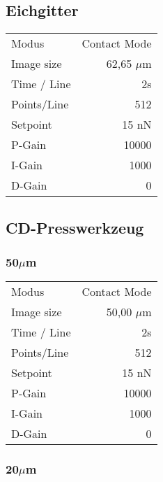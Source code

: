 \subsection*{Eichgitter}
\begin{center}
    \centering
    \begin{tabular}{l|r}
        Modus & Contact Mode \\
        Image size & 62,65 $\mu$m \\
        Time / Line & 2s \\
        Points/Line & 512\\
        Setpoint & 15 nN \\
        P-Gain & 10000 \\
        I-Gain & 1000 \\
        D-Gain & 0 \\
        
    \end{tabular}
\end{center}

\subsection*{CD-Presswerkzeug}
\subsubsection*{50$\mu$m}
\begin{center}
    \centering
    \begin{tabular}{l|r}
        Modus & Contact Mode\\
        Image size & 50,00 $\mu$m \\
        Time / Line & 2s \\
        Points/Line & 512\\
        Setpoint & 15 nN \\
        P-Gain & 10000 \\
        I-Gain & 1000 \\
        D-Gain & 0 \\
        
    \end{tabular}
\end{center}

\subsubsection*{20$\mu$m}

